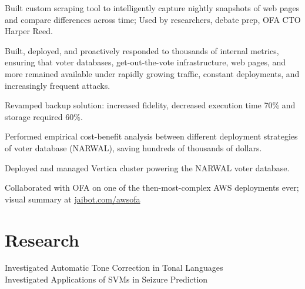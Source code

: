 \documentclass[]{resume}
\begin{document}
\begin{minipage}[t]{0.66\textwidth}
\descript{}
\begin{tightemize}
\item Built custom scraping tool to intelligently capture nightly snapshots of web pages and compare differences across time; Used by researchers, debate prep, OFA CTO Harper Reed.
\item Built, deployed, and proactively responded to thousands of internal metrics, ensuring that voter databases, get-out-the-vote infrastructure, web pages, and more remained available under rapidly growing traffic, constant deployments, and increasingly frequent attacks.
\item Revamped backup solution: increased fidelity, decreased execution time 70\% and storage required 60\%.
\item Performed empirical cost-benefit analysis between different deployment strategies of voter database (NARWAL), saving hundreds of thousands of dollars.
\item Deployed and managed Vertica cluster powering the NARWAL voter database.
\item Collaborated with OFA on one of the then-most-complex AWS deployments ever; visual summary at \href{http://www.jaibot.com/awsofa}{jaibot.com/awsofa}
\end{tightemize}
\sectionsep


\section{Research}

Investigated Automatic Tone Correction in Tonal Languages
\sectionsep\\
Investigated Applications of SVMs in Seizure Prediction




% 
% 

\end{minipage} 
\end{document}
